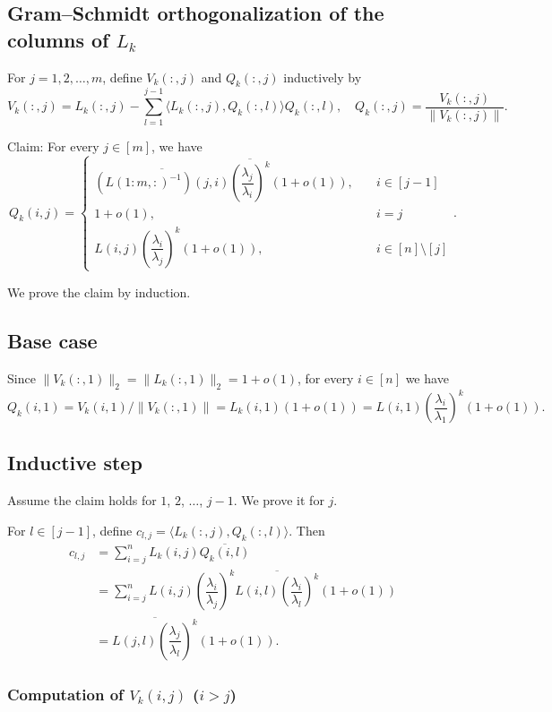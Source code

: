 \documentclass[11pt,a4paper]{article}
\theoremstyle{plain}              %
\theoremstyle{definition}         %
\begin{document}
\subsection{Gram--Schmidt orthogonalization of the columns of \(L_k\)}

For \(j=1,2,\dots,m\), define \(V_k(:,j)\) and \(Q_k(:,j)\) inductively by
\[
V_k(:,j)=L_k(:,j)-\sum_{l=1}^{j-1}\langle L_k(:,j),Q_k(:,l)\rangle Q_k(:,l),\quad Q_k(:,j)=\dfrac{V_k(:,j)}{\|V_k(:,j)\|}.
\]

Claim: For every \(j\in[m]\), we have
\[
Q_k(i,j)=\begin{cases}
\overline{(L(1:m,:)^{-1})(j,i)}\overline{\left(\dfrac{\lambda_j}{\lambda_i}\right)^k}(1+o(1)),\quad&i\in[j-1]\\
1+o(1),\quad&i=j\\
L(i,j)\left(\dfrac{\lambda_i}{\lambda_j}\right)^k(1+o(1)),\quad&i\in[n]\setminus[j]
\end{cases}.
\]

We prove the claim by induction.

\subsection{Base case}

Since \(\|V_k(:,1)\|_2=\|L_k(:,1)\|_2=1+o(1)\), for every \(i\in[n]\) we have
\[
Q_k(i,1)=V_k(i,1)/\|V_k(:,1)\|=L_k(i,1)(1+o(1))=L(i,1)\left(\dfrac{\lambda_i}{\lambda_1}\right)^k(1+o(1)).
\]

\subsection{Inductive step}

Assume the claim holds for \(1\), \(2\), \(\dots\), \(j-1\). We prove it for \(j\).

For \(l\in[j-1]\), define \(c_{l,j}=\langle L_k(:,j), Q_k(:,l)\rangle\). Then
\begin{align*}
c_{l,j}&=\sum_{i=j}^{n}L_k(i,j)\overline{Q_k(i,l)}\\
&=\sum_{i=j}^{n}L(i,j)\left(\dfrac{\lambda_i}{\lambda_j}\right)^k\overline{L(i,l)\left(\dfrac{\lambda_i}{\lambda_l}\right)^k}(1+o(1))\\
&=\overline{L(j,l)\left(\dfrac{\lambda_j}{\lambda_l}\right)^k}(1+o(1)).
\end{align*}

\subsubsection{Computation of \(V_k(i,j)\) (\(i>j\))}
\end{document}
